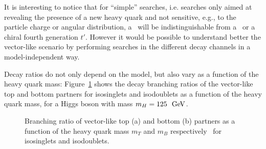 It is interesting to notice that for ``simple'' searches,
i.e. searches only aimed at revealing the presence of a new
heavy quark and not sensitive, e.g., to the particle charge
or angular distribution, a \Ylr\ will be indistinguishable from
a \BYlr\ or a chiral fourth generation $t'$. However it would be
possible to understand better the vector-like scenario by 
performing searches in the different decay channels in a 
model-independent way.

Decay ratios do not only depend on the model, but also
vary as a function of the heavy quark mass: Figure~\ref{fig:vlqbrs}
shows the decay branching ratios of the vector-like top and
bottom partners for isosinglets and isodoublets as a function
of the heavy quark mass, for a Higgs boson with mass $m_H=125~\gev$.

\begin{figure}
\centering
\caption{Branching ratio of vector-like top (a) and bottom (b) partners as a function of the heavy quark mass $m_T$ and $m_B$ respectively~\cite{ATLAS-CONF-2013-056} for isosinglets and isodoublets.}
\label{fig:vlqbrs}
\end{figure}

